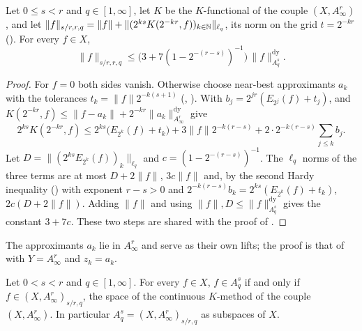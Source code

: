\begin{theorem}
\label{thm:approximation-space-couple-inverse}
\leanok
{}
Let $0 \leq s < r$ and $q \in [1, \infty]$, let $K$ be the $K$-functional of the couple
$(X, A^r_\infty)$, and let
$\|f\|_{s/r, r, q} = \|f\| + \|(2^{ks} K(2^{-kr}, f))_{k \in \mathbb{N}}\|_{\ell_q}$, its norm on the grid
$t = 2^{-kr}$ (). For every $f \in X$,
\[
  \|f\|_{s/r, r, q} \leq \bigl(3 + 7 (1 - 2^{-(r-s)})^{-1}\bigr) \,
  \|f\|^{\mathrm{dy}}_{A^s_q} .
\]
\end{theorem}

\begin{proof}
\leanok
For $f = 0$ both sides vanish. Otherwise choose near-best approximants $a_k$ with the
tolerances $t_k = \|f\| 2^{-k(s+1)}$ (, ). With
$b_j = 2^{jr} (E_{2^j}(f) + t_j)$,  and
$K(2^{-kr}, f) \leq \|f - a_k\| + 2^{-kr} \|a_k\|^{\mathrm{dy}}_{A^r_\infty}$ give
\[
  2^{ks} K(2^{-kr}, f) \leq 2^{ks} \bigl(E_{2^k}(f) + t_k\bigr) + 3 \|f\| 2^{-k(r-s)}
  + 2 \cdot 2^{-k(r-s)} \sum_{j \leq k} b_j .
\]
Let $D = \|(2^{ks} E_{2^k}(f))_k\|_{\ell_q}$ and $c = (1 - 2^{-(r-s)})^{-1}$. The $\ell_q$ norms
of the three terms are at most $D + 2 \|f\|$, $3 c \|f\|$ and, by the second Hardy inequality
() with exponent $r - s > 0$ and $2^{-k(r-s)} b_k = 2^{ks}(E_{2^k}(f) + t_k)$,
$2 c (D + 2 \|f\|)$. Adding $\|f\|$ and using $\|f\|, D \leq \|f\|^{\mathrm{dy}}_{A^s_q}$ gives
the constant $3 + 7c$. These two steps are shared with the proof of .
\end{proof}

The approximants $a_k$ lie in $A^r_\infty$ and serve as their own lifts; the proof is that of
 with $Y = A^r_\infty$ and $z_k = a_k$.

\begin{theorem}
\label{thm:approximation-spaces-interpolate}
\leanok
{}
Let $0 < s < r$ and $q \in [1, \infty]$. For every $f \in X$, $f \in A^s_q$ if and only if
$f \in (X, A^r_\infty)_{s/r, q}$, the space of the continuous $K$-method of the couple
$(X, A^r_\infty)$. In particular $A^s_q = (X, A^r_\infty)_{s/r, q}$ as subspaces of $X$.
\end{theorem}

